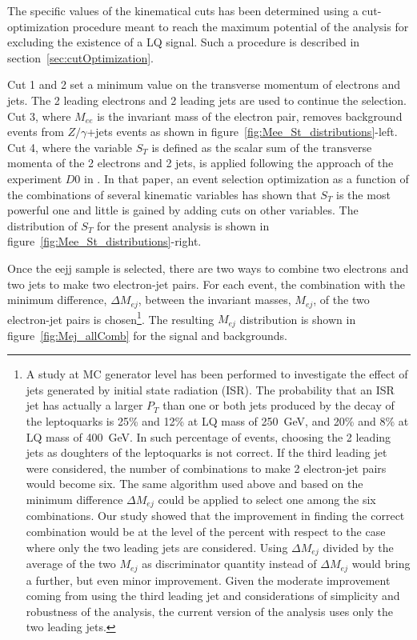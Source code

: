 The specific values of the kinematical cuts has been determined using a cut-optimization procedure meant to
reach the maximum potential of the analysis for excluding the existence of a LQ signal. 
Such a procedure is described in section~\ref{sec:cutOptimization}.

Cut 1 and 2 set a minimum value on the transverse momentum of electrons and jets. 
The 2 leading electrons and 2 leading jets are used to continue the selection.
Cut 3, where $M_{ee}$ is the invariant mass of the electron pair, removes background events from 
$Z/\gamma$+jets events as shown in figure~\ref{fig:Mee_St_distributions}-left.
Cut 4, where the variable $S_T$ is defined as the scalar sum of the transverse momenta of the 
2 electrons and 2 jets, is applied following the approach of the experiment $D0$ in 
\cite{Abazov:2001mx}. In that paper, an event selection optimization as a function of
the combinations of several kinematic variables has shown that $S_T$ is the most powerful one 
and little is gained by adding cuts on other variables. The distribution of $S_T$ for the present
analysis is shown in figure~\ref{fig:Mee_St_distributions}-right.

Once the eejj sample is selected, there are two ways to combine two electrons and two jets to make two electron-jet pairs. 
For each event, the combination with the minimum difference, $\Delta M_{ej}$, between the invariant masses, $M_{ej}$, 
of the two electron-jet pairs is chosen\footnote{
A study at MC generator level has been performed to investigate the effect of jets generated by initial state 
radiation (ISR). The probability that an ISR jet has actually a larger $P_T$ than one or both jets produced 
by the decay of the leptoquarks is 25\% and 12\% at LQ mass of 250~GeV, and 20\% and 8\% at LQ mass of 400~GeV. 
In such percentage of events, choosing the 2 leading jets as doughters of the leptoquarks is not correct. 
If the third leading jet were considered, the number of combinations to make 2 electron-jet pairs would become six.
The same algorithm used above and based on the minimum difference $\Delta M_{ej}$ could be applied to select one 
among the six combinations. Our study showed that the improvement in finding the correct combination would be at the level
of the percent with respect to the case where only the two leading jets are considered.
Using $\Delta M_{ej}$ divided by the average of the two $M_{ej}$ as discriminator quantity instead of $\Delta M_{ej}$
would bring a further, but even minor improvement.
Given the moderate improvement coming from using the third leading jet and considerations of simplicity and robustness
of the analysis, the current version of the analysis uses only the two leading jets.
}. 
The resulting $M_{ej}$ distribution is shown in figure~\ref{fig:Mej_allComb} for the signal and backgrounds. 


